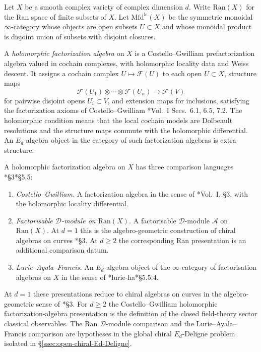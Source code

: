 Let $X$ be a smooth complex variety of complex dimension $d$.  Write
$\mathrm{Ran}(X)$ for the Ran space of finite subsets of $X$.  Let
$\mathrm{Mfd}^{\mathrm{lc}}(X)$ be the symmetric monoidal $\infty$-category
whose objects are open subsets $U\subset X$ and whose monoidal product
is disjoint union of subsets with disjoint closures.

\begin{defn}\label{app:defn:hol-fact-Ed}
A \emph{holomorphic factorization algebra} on \(X\) is a
Costello--Gwilliam prefactorization algebra valued in cochain
complexes, with holomorphic locality data and Weiss descent.  It
assigns a cochain complex \(U\mapsto\mathcal F(U)\) to each open
\(U\subset X\), structure maps
\[
  \mathcal F(U_1)\otimes\cdots\otimes\mathcal F(U_n)
   \longrightarrow
   \mathcal F(V)
\]
for pairwise disjoint opens \(U_i\subset V\), and extension maps for
inclusions, satisfying the factorization axioms of Costello--Gwilliam
\cite{costello-gwilliam}*{Vol.~I Secs.~6.1, 6.5, 7.2}.  The holomorphic
condition means that the local cochain models are Dolbeault
resolutions and the structure maps commute with the holomorphic
differential.  An \(E_d\)-algebra object in the category of such
factorization algebras is extra structure.
\end{defn}

\begin{rmk}
A holomorphic factorization algebra on $X$ has three comparison
languages
\cite{beilinson-drinfeld-chiral}*{\S 3}\cite{francis-thesis}\cite{lurie-ha}*{\S 5.5}:
\begin{enumerate}
  \item \emph{Costello--Gwilliam.}  A factorization algebra in the sense
    of \cite{costello-gwilliam}*{Vol.~I, \S 3}, with the holomorphic
    locality differential.
  \item \emph{Factorisable $\mathcal D$-module on
    $\mathrm{Ran}(X)$.}  A factorisable $\mathcal D$-module
    $\mathcal A$ on $\mathrm{Ran}(X)$.  At
    $d=1$ this is the algebro-geometric construction of chiral
    algebras on curves \cite{beilinson-drinfeld-chiral}*{\S 3}.  At
    $d\geq2$ the corresponding Ran presentation is an additional
    comparison datum.
  \item \emph{Lurie--Ayala--Francis.}  An $E_d$-algebra object of the
    $\infty$-category of factorisation algebras on $X$ in the sense of
    \cites{ayala-francis}*{}{lurie-ha}*{\S 5.5.4}.
\end{enumerate}
At $d=1$ these presentations reduce to chiral algebras on curves in the
algebro-geometric sense of \cite{beilinson-drinfeld-chiral}*{\S 3}.
For $d\geq 2$ the Costello--Gwilliam holomorphic
factorization-algebra presentation is the definition of
the closed field-theory sector classical observables.  The Ran
\(\mathcal D\)-module comparison and the Lurie--Ayala--Francis
comparison are hypotheses in the global chiral \(E_d\)-Deligne
problem isolated in
\S\ref{ssec:open-chiral-Ed-Deligne}.
\end{rmk}

